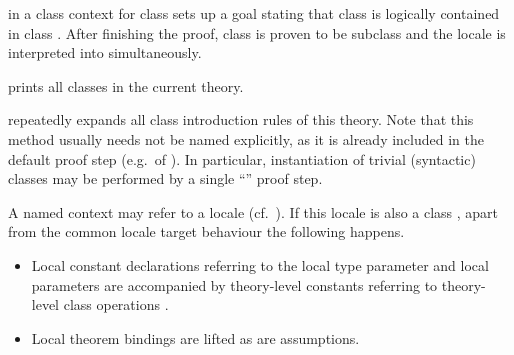 \begin{isabellebody}
\begin{isamarkuptext}
\begin{descr}
  \item [\mbox{\isa{\isacommand{subclass}}}~\isa{c}] in a class context for class
   sets up a goal stating that class  is logically
  contained in class .  After finishing the proof, class
   is proven to be subclass  and the locale  is interpreted into  simultaneously.

  \item [\mbox{\isa{\isacommand{print{\isacharunderscore}classes}}}] prints all classes in the current
  theory.

  \item [\mbox{\isa{intro{\isacharunderscore}classes}}] repeatedly expands all class
  introduction rules of this theory.  Note that this method usually
  needs not be named explicitly, as it is already included in the
  default proof step (e.g.\ of \mbox{}).  In particular,
  instantiation of trivial (syntactic) classes may be performed by a
  single ``\mbox{\isa{\isacommand{{\isachardot}{\isachardot}}}}'' proof step.

  \end{descr}%
\end{isamarkuptext}%
\isamarkuptrue%
%
\isamarkuptrue%
%
\begin{isamarkuptext}%

  A named context may refer to a locale (cf.\ ).
  If this locale is also a class , apart from the common
  locale target behaviour the following happens.

  \begin{itemize}

  \item Local constant declarations  referring to the
  local type parameter \isa{{\isasymalpha}} and local parameters 
  are accompanied by theory-level constants 
  referring to theory-level class operations .

  \item Local theorem bindings are lifted as are assumptions.


\end{itemize}
\end{isamarkuptext}
\end{isabellebody}
